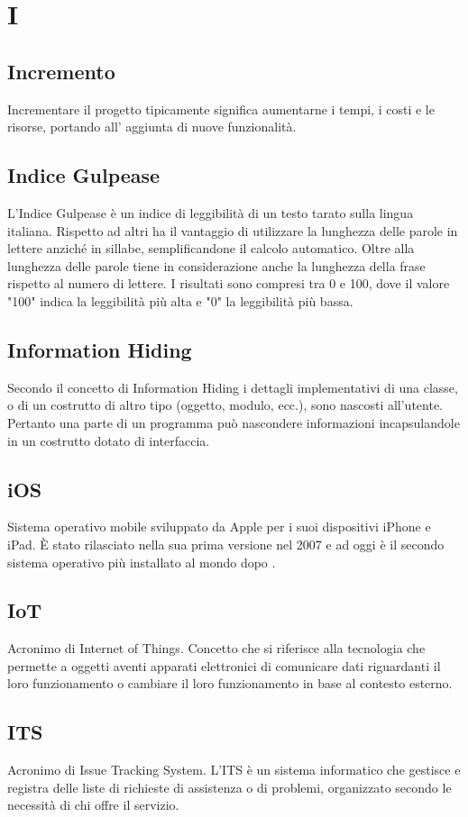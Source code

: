 \section*{I}
\markright{}
\subsection*{Incremento}
Incrementare il progetto tipicamente significa aumentarne i tempi, i costi e le risorse, portando all' aggiunta di nuove funzionalità.

\subsection*{Indice Gulpease}
L'Indice Gulpease è un indice di leggibilità di un testo tarato sulla lingua italiana. Rispetto ad altri ha il vantaggio di utilizzare la lunghezza delle parole in lettere anziché in sillabe, semplificandone il calcolo automatico. Oltre alla lunghezza delle parole tiene in considerazione anche la lunghezza della frase rispetto al numero di lettere. I risultati sono compresi tra 0 e 100, dove il valore "100" indica la leggibilità più alta e "0" la leggibilità più bassa.

\subsection*{Information Hiding}
Secondo il concetto di Information Hiding i dettagli implementativi di una classe, o di un costrutto di altro tipo (oggetto, modulo, ecc.), sono nascosti all'utente. Pertanto una parte di un programma può nascondere informazioni incapsulandole in un costrutto dotato di interfaccia.

\subsection*{iOS}
Sistema operativo mobile sviluppato da Apple per i suoi dispositivi iPhone e iPad. È stato rilasciato nella sua prima versione nel 2007 e ad oggi è il secondo sistema operativo più installato al mondo dopo .

\subsection*{IoT}
Acronimo di Internet of Things. Concetto che si riferisce alla tecnologia che permette a oggetti aventi apparati elettronici di comunicare dati riguardanti il loro funzionamento o cambiare il loro funzionamento in base al contesto esterno. 

\subsection*{ITS}
Acronimo di Issue Tracking System. L'ITS è un sistema informatico che gestisce e registra delle liste di richieste di assistenza o di problemi, organizzato secondo le necessità di chi offre il servizio.